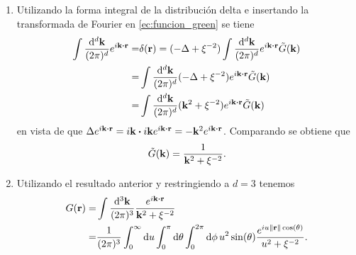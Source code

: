 \documentclass{article}
\begin{document}
\begin{enumerate}
\item Utilizando la forma integral de la distribución delta e insertando la transformada de Fourier en \eqref{ec:funcion_green} se tiene
\begin{align}
\begin{split}
\int\frac{\dd[d]{\vb{k}}}{(2\pi)^d}e^{i\vb{k}\vdot\vb{r}}=&\delta(\vb{r})=(-\Delta+\xi^{-2})\int\frac{\dd[d]{\vb{k}}}{(2\pi)^d}e^{i\vb{k}\vdot\vb{r}}\tilde{G}(\vb{k})\\
=&\int\frac{\dd[d]{\vb{k}}}{(2\pi)^d}(-\Delta+\xi^{-2})e^{i\vb{k}\vdot\vb{r}}\tilde{G}(\vb{k})\\
=&\int\frac{\dd[d]{\vb{k}}}{(2\pi)^d}(\vb{k}^2+\xi^{-2})e^{i\vb{k}\vdot\vb{r}}\tilde{G}(\vb{k})
\end{split}
\end{align}
en vista de que $\Delta e^{i\vb{k}\vdot\vb{r}}=i\vb{k}\vdot i\vb{k}e^{i\vb{k}\vdot\vb{r}}=-\vb{k}^2e^{i\vb{k}\vdot\vb{r}}$. Comparando se obtiene que 
\begin{equation}
\tilde{G}(\vb{k})=\frac{1}{\vb{k}^2+\xi^{-2}}.
\end{equation} 

\item Utilizando el resultado anterior y restringiendo a $d=3$ tenemos 
\begin{align}
\begin{split}
G(\vb{r})=&\int\frac{\dd[3]{\vb{k}}}{(2\pi)^3}\frac{e^{i\vb{k}\vdot\vb{r}}}{\vb{k}^2+\xi^{-2}}\\
=&\frac{1}{(2\pi)^3}\int_0^\infty\dd{u}\int_0^\pi\dd{\theta}\int_0^{2\pi}\dd{\phi}u^2\sin(\theta)\frac{e^{iu\|\vb{r}\|\cos(\theta)}}{u^2+\xi^{-2}}.
\end{split}
\end{align}

\end{enumerate}
\end{document}

